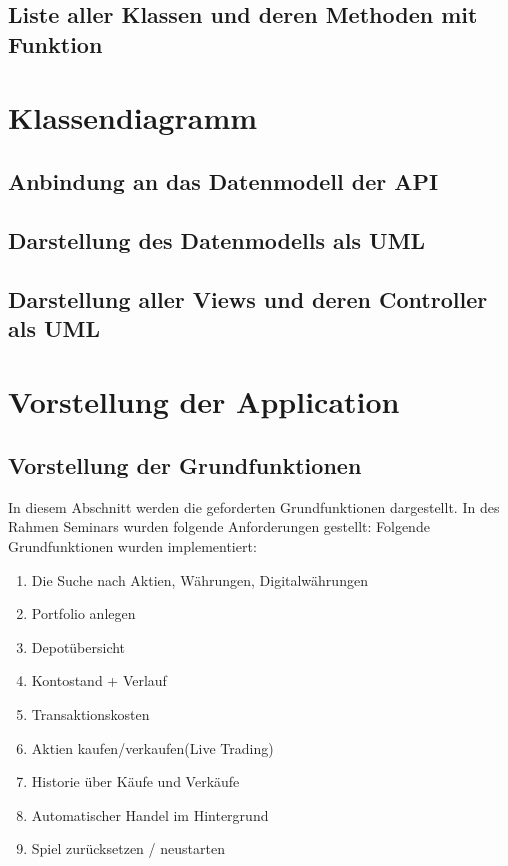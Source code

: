 \documentclass[10pt]{scrartcl}
\begin{document}
\subsection{Liste aller Klassen und deren Methoden mit Funktion}

\section{Klassendiagramm}

\subsection{Anbindung an das Datenmodell der API}

\subsection{Darstellung des Datenmodells als UML}

\subsection{Darstellung aller Views und deren Controller als UML}

\section{Vorstellung der Application}

\subsection{Vorstellung der Grundfunktionen}
In diesem Abschnitt werden die geforderten Grundfunktionen dargestellt. In des Rahmen Seminars wurden folgende Anforderungen gestellt:
\newline
Folgende Grundfunktionen wurden implementiert:
\begin{enumerate}
	\item Die Suche nach Aktien, Währungen, Digitalwährungen
	\item Portfolio anlegen
	\item Depotübersicht
	\item Kontostand + Verlauf
	\item Transaktionskosten
	\item Aktien kaufen/verkaufen(Live Trading)
	\item Historie über Käufe und Verkäufe
	\item Automatischer Handel im Hintergrund
	\item Spiel zurücksetzen / neustarten
\end{enumerate}
\end{document}
